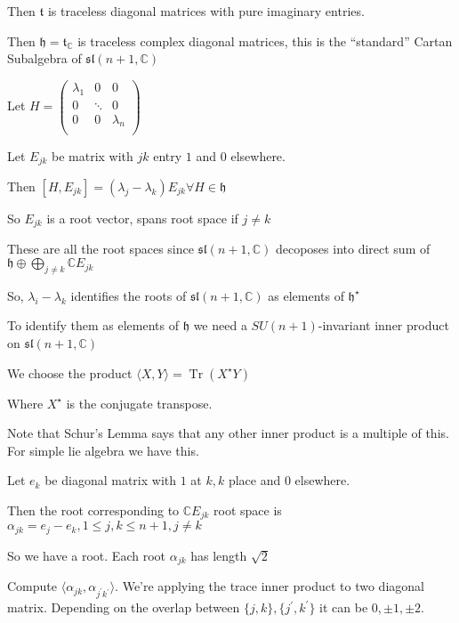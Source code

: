 \documentclass{article}
\theoremstyle{definition}
\newcommand{\Tr}{\operatorname{Tr}}
\begin{document}
Then \(\mathfrak{t} \) is traceless diagonal matrices with pure imaginary entries.

Then \(\mathfrak{h} = \mathfrak{t} _\mathbb{C}\) is traceless complex diagonal matrices, this is the ``standard'' Cartan Subalgebra of \(\mathfrak{sl}(n+1,\mathbb{C}) \) 

Let \(H = \begin{pmatrix}
    \lambda_1 & 0 &  0 \\
    0 & \ddots &  0 \\
    0 & 0 &  \lambda _n \\
\end{pmatrix}\) 

Let \(E_{jk}\) be matrix with \(jk\) entry \(1\) and \(0\) elsewhere.

Then \([H,E_{jk}]=(\lambda_j -\lambda _k)E_{jk} \forall H\in \mathfrak{h}  \) 

So \(E_{jk}\) is a root vector, spans root space if \(j \neq k\) 

These are all the root spaces since \(\mathfrak{sl}(n+1,\mathbb{C}) \) decoposes into direct sum of \(\mathfrak{h}\oplus \bigoplus_{j\neq k}^{} \mathbb{C} E_{jk} \)  

So, \(\lambda _i - \lambda _k\) identifies the roots of \(\mathfrak{sl}(n+1,\mathbb{C}) \) as elements of \(\mathfrak{h}^{\star} \)

To identify them as elements of \(\mathfrak{h} \) we need a \(SU(n+1)\)-invariant inner product on \(\mathfrak{sl} (n+1,\mathbb{C})\) 

We choose the product \(\langle X,Y \rangle =\Tr (X^{\star} Y)\) 

Where \(X^{\star} \) is the conjugate transpose.

Note that Schur's Lemma says that any other inner product is a multiple of this. For simple lie algebra we have this.

Let \(e_k\) be diagonal matrix with \(1\) at \(k,k\) place and \(0\) elsewhere.

Then the root corresponding to \(\mathbb{C} E_{jk}\) root space is \(\alpha _{jk}=e_j - e_k, 1 \leq j,k \leq n+1, j\neq k\) 

So we have a root. Each root \(\alpha_{jk}\) has length \(\sqrt{2} \) 

Compute \(\langle \alpha_{jk} , \alpha_{j^{\prime} k^{\prime} } \rangle \). We're applying the trace inner product to two diagonal matrix. Depending on the overlap between \(\{ j,k \} , \{ j^{\prime} ,k^{\prime}  \} \) it can be \(0,\pm 1,\pm 2\).
\end{document}
